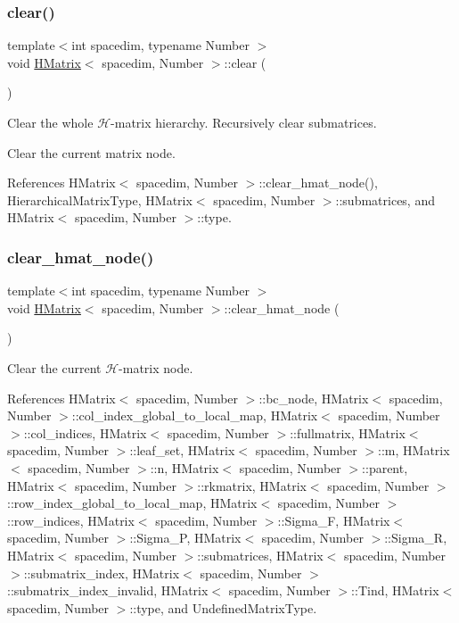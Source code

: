 \subsubsection{\texorpdfstring{clear()}{clear()}}
{\footnotesize\ttfamily template$<$int spacedim, typename Number $>$ \\
void \hyperlink{classHMatrix}{H\+Matrix}$<$ spacedim, Number $>$\+::clear (\begin{DoxyParamCaption}{ }\end{DoxyParamCaption})}

Clear the whole $\mathcal{H}$-\/matrix hierarchy. Recursively clear submatrices.

Clear the current matrix node.

References H\+Matrix$<$ spacedim, Number $>$\+::clear\+\_\+hmat\+\_\+node(), Hierarchical\+Matrix\+Type, H\+Matrix$<$ spacedim, Number $>$\+::submatrices, and H\+Matrix$<$ spacedim, Number $>$\+::type.

\mbox{\label{classHMatrix_aec0815bc9c3654391bb2b3095383e6cb}} 
\subsubsection{\texorpdfstring{clear\+\_\+hmat\+\_\+node()}{clear\_hmat\_node()}}
{\footnotesize\ttfamily template$<$int spacedim, typename Number $>$ \\
void \hyperlink{classHMatrix}{H\+Matrix}$<$ spacedim, Number $>$\+::clear\+\_\+hmat\+\_\+node (\begin{DoxyParamCaption}{ }\end{DoxyParamCaption})}

Clear the current $\mathcal{H}$-\/matrix node. 

References H\+Matrix$<$ spacedim, Number $>$\+::bc\+\_\+node, H\+Matrix$<$ spacedim, Number $>$\+::col\+\_\+index\+\_\+global\+\_\+to\+\_\+local\+\_\+map, H\+Matrix$<$ spacedim, Number $>$\+::col\+\_\+indices, H\+Matrix$<$ spacedim, Number $>$\+::fullmatrix, H\+Matrix$<$ spacedim, Number $>$\+::leaf\+\_\+set, H\+Matrix$<$ spacedim, Number $>$\+::m, H\+Matrix$<$ spacedim, Number $>$\+::n, H\+Matrix$<$ spacedim, Number $>$\+::parent, H\+Matrix$<$ spacedim, Number $>$\+::rkmatrix, H\+Matrix$<$ spacedim, Number $>$\+::row\+\_\+index\+\_\+global\+\_\+to\+\_\+local\+\_\+map, H\+Matrix$<$ spacedim, Number $>$\+::row\+\_\+indices, H\+Matrix$<$ spacedim, Number $>$\+::\+Sigma\+\_\+F, H\+Matrix$<$ spacedim, Number $>$\+::\+Sigma\+\_\+P, H\+Matrix$<$ spacedim, Number $>$\+::\+Sigma\+\_\+R, H\+Matrix$<$ spacedim, Number $>$\+::submatrices, H\+Matrix$<$ spacedim, Number $>$\+::submatrix\+\_\+index, H\+Matrix$<$ spacedim, Number $>$\+::submatrix\+\_\+index\+\_\+invalid, H\+Matrix$<$ spacedim, Number $>$\+::\+Tind, H\+Matrix$<$ spacedim, Number $>$\+::type, and Undefined\+Matrix\+Type.



